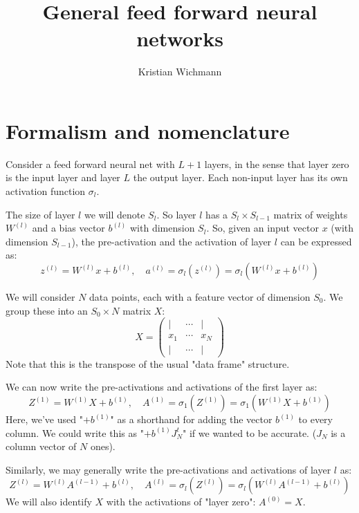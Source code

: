 \documentclass[12pt, a4paper]{article}
\title{General feed forward neural networks}
\author{Kristian Wichmann}
\numberwithin{equation}{section}
\begin{document}
\maketitle

\section{Formalism and nomenclature}
Consider a feed forward neural net with $L+1$ layers, in the sense that layer zero is the input layer and layer $L$ the output layer. Each non-input layer has its own activation function $\sigma_l$.

The size of layer $l$ we will denote $S_l$. So layer $l$ has a $S_l\times S_{l-1}$ matrix of weights $W^{(l)}$ and a bias vector $b^{(l)}$ with dimension $S_l$. So, given an input vector $x$ (with dimension $S_{l-1}$), the pre-activation and the activation of layer $l$ can be expressed as:
\begin{equation}
\label{forward_propagation}
z^{(l)}=W^{(l)} x + b^{(l)},\quad a^{(l)}=\sigma_l(z^{(l)})=\sigma_l(W^{(l)} x + b^{(l)})
\end{equation}

We will consider $N$ data points, each with a feature vector of dimension $S_0$. We group these into an $S_0\times N$ matrix $X$:
\begin{equation}
X=
\begin{pmatrix}
| & \cdots & | \\
x_1 & \cdots & x_N \\
| & \cdots & |
\end{pmatrix}
\end{equation}
Note that this is the transpose of the usual "data frame" structure.

We can now write the pre-activations and activations of the first layer as:
\begin{equation}
Z^{(1)}=W^{(1)} X+b^{(1)},\quad A^{(1)}=\sigma_1(Z^{(1)})=\sigma_1(W^{(1)} X+b^{(1)})
\end{equation}
Here, we've used "$+b^{(1)}$" as a shorthand for adding the vector $b^{(1)}$ to every column. We could write this as "$+b^{(1)} J^t_{N}$" if we wanted to be accurate. ($J_N$ is a column vector of $N$ ones).

Similarly, we may generally write the pre-activations and activations of layer $l$ as:
\begin{equation}
Z^{(l)}=W^{(l)} A^{(l-1)}+b^{(l)},\quad A^{(l)}=\sigma_l(Z^{(l)})=\sigma_l(W^{(l)} A^{(l-1)}+b^{(l)})
\end{equation}
We will also identify $X$ with the activations of "layer zero": $A^{(0)}=X$.
\end{document}
